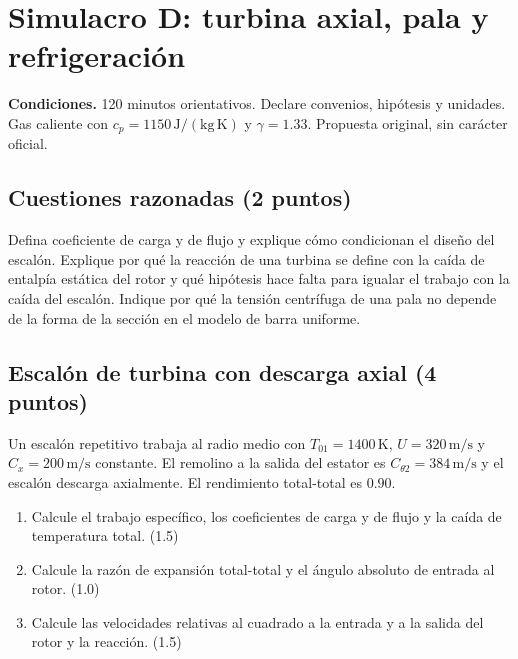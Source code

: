\chapter{Simulacro D: turbina axial, pala y refrigeración}
\noindent\textbf{Condiciones.} 120 minutos orientativos. Declare convenios, hipótesis y unidades. Gas caliente con $c_p=1150\,\mathrm{J/(kg\,K)}$ y $\gamma=1.33$. Propuesta original, sin carácter oficial.
\section{Cuestiones razonadas (2 puntos)}
Defina coeficiente de carga y de flujo y explique cómo condicionan el diseño del escalón. Explique por qué la reacción de una turbina se define con la caída de entalpía estática del rotor y qué hipótesis hace falta para igualar el trabajo con la caída del escalón. Indique por qué la tensión centrífuga de una pala no depende de la forma de la sección en el modelo de barra uniforme.
\section{Escalón de turbina con descarga axial (4 puntos)}
Un escalón repetitivo trabaja al radio medio con $T_{01}=1400\,\mathrm K$, $U=320\,\mathrm{m/s}$ y $C_x=200\,\mathrm{m/s}$ constante. El remolino a la salida del estator es $C_{\theta2}=384\,\mathrm{m/s}$ y el escalón descarga axialmente. El rendimiento total-total es $0.90$.
\begin{enumerate}[label=\alph*)]
\item Calcule el trabajo específico, los coeficientes de carga y de flujo y la caída de temperatura total. (1.5)
\item Calcule la razón de expansión total-total y el ángulo absoluto de entrada al rotor. (1.0)
\item Calcule las velocidades relativas al cuadrado a la entrada y a la salida del rotor y la reacción. (1.5)
\end{enumerate}
